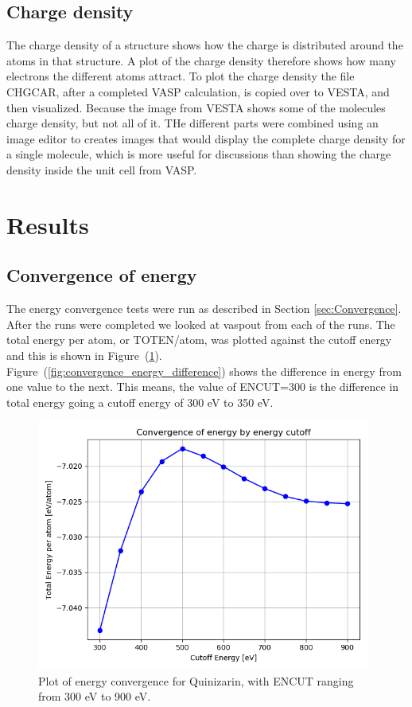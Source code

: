 \documentclass{article}
\begin{document}
  \subsection{Charge density}

    The charge density of a structure shows how the charge is distributed around the atoms in that structure. A plot of the charge density therefore shows how many electrons the different atoms attract. To plot the charge density the file CHGCAR, after a completed VASP calculation, is copied over to VESTA, and then visualized. Because the image from VESTA shows some of the molecules charge density, but not all of it. THe different parts were combined using an image editor to creates images that would display the complete charge density for a single molecule, which is more useful for discussions than showing the charge density inside the unit cell from VASP.


\vspace{1cm}

\section{Results}   \label{sec:Results}

  \subsection{Convergence of energy}

     The energy convergence tests were run as described in Section \ref{sec:Convergence}. After the runs were completed we looked at vaspout from each of the runs. The total energy per atom, or TOTEN/atom, was plotted against the cutoff energy and this is shown in Figure~(\ref{fig:convergence_energy}). \\

     Figure~(\ref{fig:convergence_energy_difference}) shows the difference in energy from one value to the next. This means, the value of ENCUT=300 is the difference in total energy going a cutoff energy of 300 eV to 350 eV. \\

    \begin{figure}[H]
      \centering
      \includegraphics[width = 11cm]{../fig/convergence_energy.png}
      \caption{Plot of energy convergence for Quinizarin, with ENCUT ranging from 300 eV to 900 eV. }
      \label{fig:convergence_energy}
    \end{figure}
\end{document}
